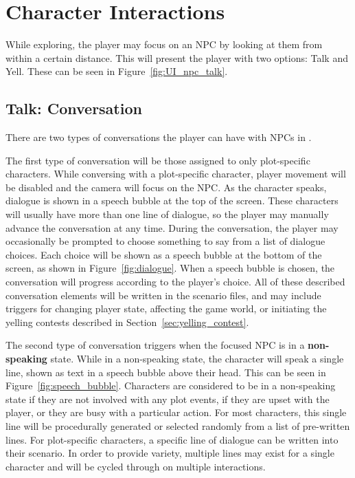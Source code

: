 \section{Character Interactions}
While exploring, the player may focus on an NPC by looking at them from within a certain distance. This will present the player with two options: Talk and Yell. These can be seen in Figure~\ref{fig:UI_npc_talk}.

\subsection{Talk: Conversation}
\label{sec:conversation}
There are two types of conversations the player can have with NPCs in \ourgame{}.

The first type of conversation will be those assigned to only plot-specific characters. While conversing with a plot-specific character, player movement will be disabled and the camera will focus on the NPC. As the character speaks, dialogue is shown in a speech bubble at the top of the screen. These characters will usually have more than one line of dialogue, so the player may manually advance the conversation at any time. During the conversation, the player may occasionally be prompted to choose something to say from a list of dialogue choices. Each choice will be shown as a speech bubble at the bottom of the screen, as shown in Figure~\ref{fig:dialogue}. When a speech bubble is chosen, the conversation will progress according to the player's choice. All of these described conversation elements will be written in the scenario files, and may include triggers for changing player state, affecting the game world, or initiating the yelling contests described in Section~\ref{sec:yelling_contest}.

The second type of conversation triggers when the focused NPC is in a \textbf{non-speaking} state. While in a non-speaking state, the character will speak a single line, shown as text in a speech bubble above their head. This can be seen in Figure~\ref{fig:speech_bubble}. Characters are considered to be in a non-speaking state if they are not involved with any plot events, if they are upset with the player, or they are busy with a particular action. For most characters, this single line will be procedurally generated or selected randomly from a list of pre-written lines. For plot-specific characters, a specific line of dialogue can be written into their scenario. In order to provide variety, multiple lines may exist for a single character and will be cycled through on multiple interactions.

